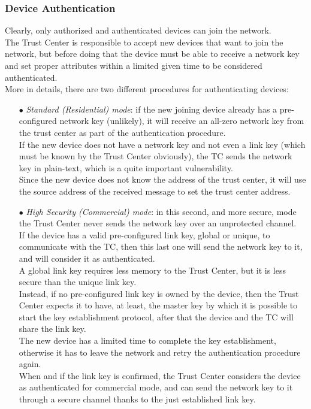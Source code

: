 \documentclass[12pt]{report}
\begin{document}
{\subsubsection{Device Authentication}
\bigskip
Clearly, only authorized and authenticated devices can join the network.\\
The Trust Center is responsible to accept new devices that want to join the network, but before doing that the device must be able to receive a network key and set proper attributes within a limited given time to be considered authenticated.\\
More in details, there are two different procedures for authenticating devices:

\begin{itemize}
\setlength{\itemindent}{+4mm}
\item[$\bullet$] \emph{Standard (Residential) mode}: if the new joining device already has a pre-configured network key (unlikely), it will receive an all-zero network key from the trust center as part of the authentication procedure.\\
If the new device does not have a network key and not even a link key (which must be known by the Trust Center obviously), the TC  sends the network key in plain-text, which is a quite important vulnerability.\\
Since the new device does not know the address of the trust center, it will use the source address of the received message to set the trust center address.

\item[$\bullet$] \emph{High Security (Commercial) mode}: in this second, and more secure, mode the Trust Center never sends the network key over an unprotected channel.\\
If the device has a valid pre-configured link key, global or unique, to communicate with the TC, then this last one will send the network key to it, and will consider it as authenticated.\\
A global link key requires less memory to the Trust Center, but it is less secure than the unique link key.\\
Instead, if no pre-configured link key is owned by the device, then the Trust Center expects it to have, at least, the master key by which it is possible to start the key establishment protocol, after that the device and the TC will share the link key.\\
The new device has a limited time to complete the key establishment, otherwise it has to leave the network and retry the authentication procedure again.\\
When and if the link key is confirmed, the Trust Center considers the device as authenticated for commercial mode, and can send the network key to it through a secure channel thanks to the just established link key.\\


\end{itemize}}
\end{document}
